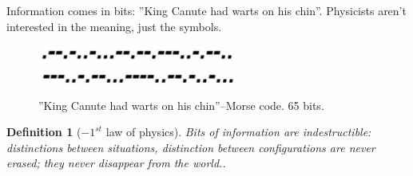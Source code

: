 \documentclass[]{article}
\newtheorem{defn}[thm]{Definition}
\begin{document}
Information comes in bits: ''King Canute had warts on his chin''. Physicists aren't interested in the meaning, just the symbols.

\begin{figure}[H]
	\begin{center}
		\caption{''King Canute had warts on his chin''--Morse code. 65 bits.}
		\includegraphics[width=0.6\textwidth]{wh-kcwc}
	\end{center}
\end{figure}

\begin{defn}[$-1^{st}$ law of physics]
	Bits of information are indestructible: distinctions between situations, distinction between configurations are never erased; they never disappear from the world..
\end{defn}
\end{document}
